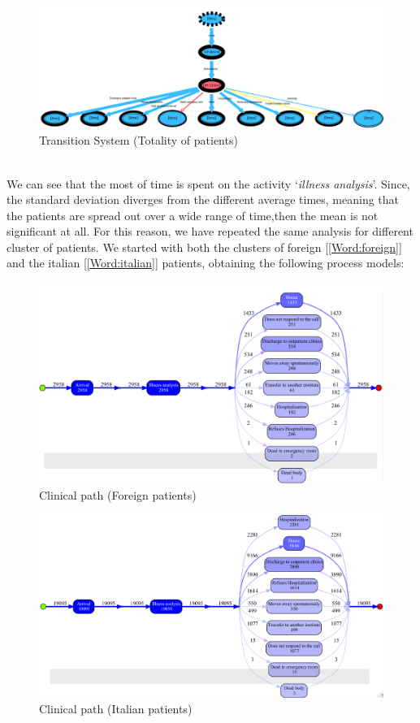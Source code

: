 \begin{figure} [htbp]
\includegraphics[width=\textwidth, keepaspectratio]{ProntoSoccorsoTransitionSystemSojourn}
\caption{Transition System (Totality of patients)}
\end{figure}\\
We can see that the most of time is spent on the activity `\textit{illness analysis}'. Since, the standard deviation diverges from the different average times, meaning that the patients are spread out over a wide range of time,then the mean is not significant at all. For this reason, we have repeated the same analysis for different cluster of patients. We started with both the clusters of foreign [\ref{Word:foreign}] and the italian [\ref{Word:italian}] patients, obtaining the following process models:
\begin{figure} [htbp]
\includegraphics[width=\textwidth , keepaspectratio]{ProntoSoccorsoInductiveVisualMinerForeigns}
\caption{Clinical path (Foreign patients)}
\end{figure}
\begin{figure} [htbp]
\includegraphics[width=\textwidth , keepaspectratio]{ProntoSoccorsoInductiveVisualMinerItalians}
\caption{Clinical path (Italian patients)}
\end{figure}\\
